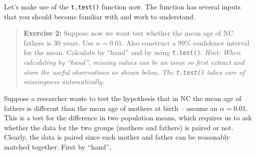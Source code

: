 \documentclass[]{book}
\newenvironment{Shaded}{\begin{snugshade}}{\end{snugshade}}
\newcommand{\KeywordTok}[1]{\textcolor[rgb]{0.13,0.29,0.53}{\textbf{#1}}}
\newcommand{\DataTypeTok}[1]{\textcolor[rgb]{0.13,0.29,0.53}{#1}}
\newcommand{\FloatTok}[1]{\textcolor[rgb]{0.00,0.00,0.81}{#1}}
\newcommand{\StringTok}[1]{\textcolor[rgb]{0.31,0.60,0.02}{#1}}
\newcommand{\CommentTok}[1]{\textcolor[rgb]{0.56,0.35,0.01}{\textit{#1}}}
\newcommand{\OperatorTok}[1]{\textcolor[rgb]{0.81,0.36,0.00}{\textbf{#1}}}
\newcommand{\NormalTok}[1]{#1}
\theoremstyle{definition}
\theoremstyle{definition}
\theoremstyle{definition}
\theoremstyle{remark}
\begin{document}
Let's make use of the \texttt{t.test()} function now. The function has
several inputs that you should become familiar with and work to
understand.

\begin{Shaded}
\end{Shaded}

\begin{quote}
\textbf{Exercise 2:} Suppose now we want test whether the mean age of NC
fathers is 30 years. Use \(\alpha = 0.01\). Also construct a 99\%
confidence interval for the mean. Calculate by ``hand'' and by using
\texttt{t.test()}. \emph{Hint: When calculating by ``hand'', missing
values can be an issue so first extract and store the useful
observations as shown below. The \texttt{t.test()} takes care of
missingness automatically.}
\end{quote}

\begin{Shaded}
\end{Shaded}

Suppose a researcher wants to test the hypothesis that in NC the mean
age of fathers is different than the mean age of mothers at birth --
assume an \(\alpha = 0.01\). This is a test for the difference in two
population means, which requires us to ask whether the data for the two
groups (mothers and fathers) is paired or not. Clearly, the data is
paired since each mother and father can be reasonably matched together.
First by ``hand'',
\end{document}
